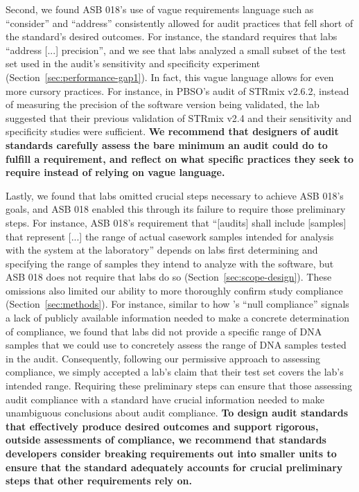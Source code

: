 Second, we found ASB 018’s use of vague requirements language such as ``consider'' and ``address'' consistently allowed for audit practices that fell short of the standard’s desired outcomes. For instance, the standard requires that labs ``address [...] precision'', and we see that labs analyzed a small subset of the test set used in the audit’s sensitivity and specificity experiment (Section~\ref{sec:performance-gap1}). In fact, this vague language allows for even more cursory practices. For instance, in PBSO's audit of STRmix v2.6.2, instead of measuring the precision of the software version being validated, the lab suggested that their previous validation of STRmix v2.4 and their sensitivity and specificity studies were sufficient. \textbf{We recommend that designers of audit standards carefully assess the bare minimum an audit could do to fulfill a requirement, and reflect on what specific practices they seek to require instead of relying on vague language.}


Lastly, we found that labs omitted crucial steps necessary to achieve ASB 018’s goals, and ASB 018 enabled this through its failure to require those preliminary steps. For instance, ASB 018's requirement that ``[audits] shall include [samples] that represent [...] the range of actual casework samples intended for analysis with the system at the laboratory'' depends on labs first determining and specifying the range of samples they intend to analyze with the software, but ASB 018 does not require that labs do so (Section~\ref{sec:scope-design}). These omissions also limited our ability to more thoroughly confirm study compliance (Section~\ref{sec:methods}). For instance, similar to how \citet{wright2024null}'s ``null compliance'' signals a lack of publicly available information needed to make a concrete determination of compliance, we found that labs did not provide a specific range of DNA samples that we could use to concretely assess the range of DNA samples tested in the audit. Consequently, following our permissive approach to assessing compliance, we simply accepted a lab's claim that their test set covers the lab's intended range. Requiring these preliminary steps can ensure  that those assessing audit compliance with a standard have crucial information needed to make unambiguous conclusions about audit compliance. \textbf{To design audit standards that effectively produce desired outcomes and support rigorous, outside assessments of compliance, we recommend that standards developers consider breaking requirements out into smaller units to ensure that the standard adequately accounts for crucial preliminary steps that other requirements rely on.}



